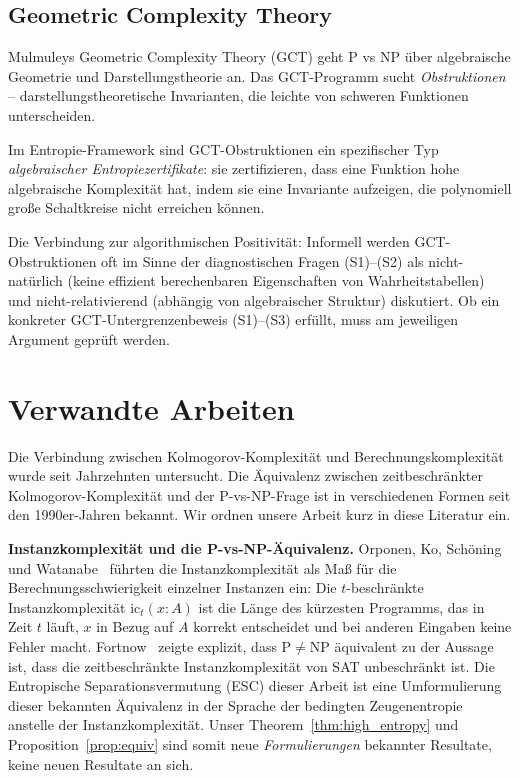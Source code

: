 \documentclass[aps,prd,twocolumn,superscriptaddress,nofootinbib]{revtex4-2}
\theoremstyle{definition}
\theoremstyle{remark}
\newcommand{\NP}{\mathrm{NP}}
\newcommand{\PP}{\mathrm{P}}
\begin{document}
\subsection{Geometric Complexity Theory}

Mulmuleys Geometric Complexity Theory (GCT) \cite{Mulmuley2011} geht $\PP$ vs $\NP$ über algebraische Geometrie und Darstellungstheorie an. Das GCT-Programm sucht \textit{Obstruktionen} -- darstellungstheoretische Invarianten, die leichte von schweren Funktionen unterscheiden.

Im Entropie-Framework sind GCT-Obstruktionen ein spezifischer Typ \textit{algebraischer Entropiezertifikate}: sie zertifizieren, dass eine Funktion hohe \glqq algebraische Komplexität\grqq{} hat, indem sie eine Invariante aufzeigen, die polynomiell große Schaltkreise nicht erreichen können.

Die Verbindung zur algorithmischen Positivität: Informell werden GCT-Obstruktionen oft im Sinne der diagnostischen Fragen (S1)--(S2) als nicht-natürlich (keine effizient berechenbaren Eigenschaften von Wahrheitstabellen) und nicht-relativierend (abhängig von algebraischer Struktur) diskutiert. Ob ein konkreter GCT-Untergrenzenbeweis (S1)--(S3) erfüllt, muss am jeweiligen Argument geprüft werden.


\section{Verwandte Arbeiten}
\label{sec:related}

Die Verbindung zwischen Kolmogorov-Komplexität und Berechnungskomplexität wurde seit Jahrzehnten untersucht. Die Äquivalenz zwischen zeitbeschränkter Kolmogorov-Komplexität und der P-vs-NP-Frage ist in verschiedenen Formen seit den 1990er-Jahren bekannt. Wir ordnen unsere Arbeit kurz in diese Literatur ein.

\textbf{Instanzkomplexität und die P-vs-NP-Äquivalenz.}
Orponen, Ko, Schöning und Watanabe~\cite{OrponenKoSchoeningWatanabe1994} führten die Instanzkomplexität als Maß für die Berechnungsschwierigkeit einzelner Instanzen ein: Die $t$-beschränkte Instanzkomplexität $\mathrm{ic}_t(x : A)$ ist die Länge des kürzesten Programms, das in Zeit $t$ läuft, $x$ in Bezug auf $A$ korrekt entscheidet und bei anderen Eingaben keine Fehler macht. Fortnow~\cite{Fortnow2000} zeigte explizit, dass $\PP \neq \NP$ äquivalent zu der Aussage ist, dass die zeitbeschränkte Instanzkomplexität von SAT unbeschränkt ist. Die Entropische Separationsvermutung (ESC) dieser Arbeit ist eine Umformulierung dieser bekannten Äquivalenz in der Sprache der bedingten Zeugenentropie anstelle der Instanzkomplexität. Unser Theorem~\ref{thm:high_entropy} und Proposition~\ref{prop:equiv} sind somit neue \emph{Formulierungen} bekannter Resultate, keine neuen Resultate an sich.
\end{document}
